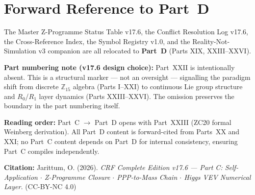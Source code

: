 \documentclass[12pt, a4paper]{article}
\begin{document}
\section*{Forward Reference to Part~D}

The Master Z-Programme Status Table v17.6, the Conflict Resolution
Log v17.6, the Cross-Reference Index, the Symbol Registry v1.0,
and the Reality-Not-Simulation v3 companion are all relocated to
\textbf{Part~D} (Parts XIX, XXIII--XXVI).

\textbf{Part numbering note (v17.6 design choice):} Part~XXII is
intentionally absent. This is a structural marker --- not an
oversight --- signalling the paradigm shift from discrete
$\mathbb{Z}_{15}$ algebra (Parts I--XXI) to continuous Lie group
structure and $R_0$/$R_1$ layer dynamics (Parts XXIII--XXVI). The
omission preserves the boundary in the part numbering itself.

\textbf{Reading order:} Part~C $\to$ Part~D opens with Part~XXIII
(ZC20 formal Weinberg derivation). All Part~D content is forward-cited
from Parts~XX and XXI; no Part~C content depends on Part~D for
internal consistency, ensuring Part~C compiles independently.

\bigskip

\begin{center}
\textbf{Citation:} Jarittum, O. (2026).
\textit{CRF Complete Edition v17.6 --- Part C:
Self-Application $\cdot$ Z-Programme Closure $\cdot$
PPP-to-Mass Chain $\cdot$ Higgs VEV Numerical Layer.}
(CC-BY-NC 4.0)
\end{center}
\end{document}
